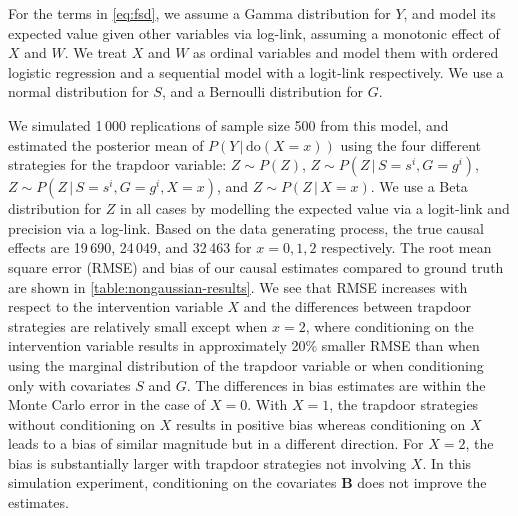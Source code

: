 \documentclass[11pt,a4paper,twoside]{article}
\newcommand{\+}[1]{\ensuremath{\mathbf{#1}}}
\newcommand{\doo}{\textrm{do}}
\newcommand{\given}{{ \, | \, }}
\begin{document}
	For the terms in \eqref{eq:fsd}, we assume a Gamma distribution for $Y$, and model its expected value given other variables via log-link, assuming a monotonic effect \citep{burkner2018} of $X$ and $W$. We treat $X$ and $W$ as ordinal variables and model them with ordered logistic regression and a sequential model with a logit-link \citep{Tutz1990, burkner2019} respectively. We use a normal distribution for $S$, and a Bernoulli distribution for $G$. 
	
	We simulated 1\,000 replications of sample size 500 from this model, and estimated the posterior mean of $P(Y \given \doo(X = x))$ using the four different strategies for the trapdoor variable: $Z \sim P(Z)$, $Z \sim P(Z \given S = s^i, G = g^i)$, $Z \sim P(Z \given S = s^i, G = g^i, X = x)$, and $Z \sim P(Z \given X = x)$. We use a Beta distribution for $Z$ in all cases by modelling the expected value via a logit-link and precision via a log-link. Based on the data generating process, the true causal effects are 19\,690, 24\,049, and 32\,463 for $x=0,1,2$ respectively. The root mean square error (RMSE) and bias of our causal estimates compared to ground truth are shown in \autoref{table:nongaussian-results}. We see that RMSE increases with respect to the intervention variable $X$ and the differences between trapdoor strategies are relatively small except when $x=2$, where conditioning on the intervention variable results in approximately 20\% smaller RMSE than when using the marginal distribution of the trapdoor variable or when conditioning only with covariates $S$ and $G$. The differences in bias estimates are within the Monte Carlo error in the case of $X=0$. With $X=1$, the trapdoor strategies without conditioning on $X$ results in positive bias whereas conditioning on $X$ leads to a bias of similar magnitude but in a different direction. For $X=2$, the bias is substantially larger with trapdoor strategies not involving $X$. In this simulation experiment, conditioning on the covariates $\+ B$ does not improve the estimates. 
\end{document}
